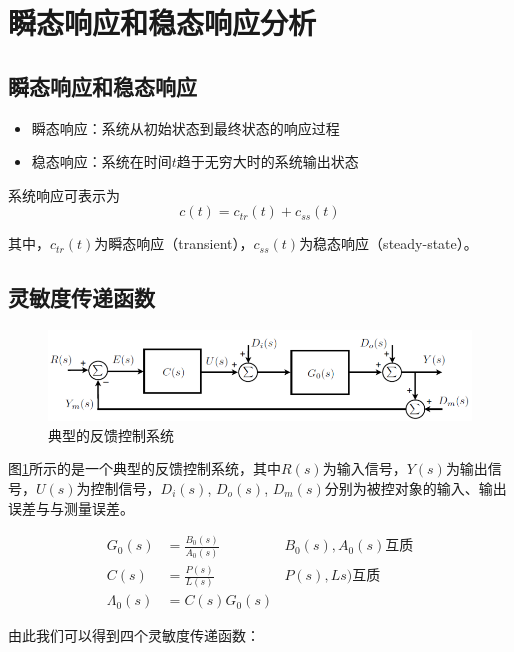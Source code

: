 \section{瞬态响应和稳态响应分析}
\subsection{瞬态响应和稳态响应}
\begin{itemize}
	\item	瞬态响应：系统从初始状态到最终状态的响应过程
	\item	稳态响应：系统在时间$t$趋于无穷大时的系统输出状态
\end{itemize}

系统响应可表示为
\begin{equation*}
c(t)=c_{tr}(t)+c_{ss}(t)
\end{equation*}

其中，$c_{tr}(t)$为瞬态响应（transient），$c_{ss}(t)$为稳态响应（steady-state）。

\subsection{灵敏度传递函数}

\begin{figure}[!ht]
	\centering
	\includegraphics[width=\linewidth]{figures/34.png}
	\caption{典型的反馈控制系统}
	\label{34}
\end{figure}

图\ref{34}所示的是一个典型的反馈控制系统，其中$R(s)$为输入信号，$Y(s)$为输出信号，$U(s)$为控制信号，$D_i(s)$, $D_o(s)$, $D_m(s)$分别为被控对象的输入、输出误差与与测量误差。

\begin{align*}
	G_0(s)&=\frac{B_0(s)}{A_0(s)}\quad&\mbox{$B_0(s), A_0(s)$互质}\\
	C(s)&=\frac{P(s)}{L(s)}\quad&\mbox{$P(s), Ls)$互质}\\ 
	\Lambda_0(s)&=C(s)G_0(s)
\end{align*}

由此我们可以得到四个灵敏度传递函数：


